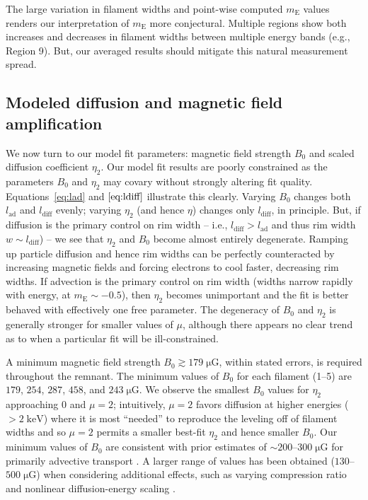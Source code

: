 \documentclass[iop, apj, numberedappendix]{emulateapj}
\newcommand*{\mt}{\mathrm}
\newcommand*{\unit}[1]{\;\mt{#1}}  %
\newcommand*{\abt}{\mathord{\sim}} %
\newcommand*{\mE}{m_\mt{E}}
\newcommand*{\muG}{\unit{\mu G}}
\begin{document}
The large variation in filament widths and point-wise computed $\mE$ values
renders our interpretation of $\mE$ more conjectural.  Multiple regions show both
increases and decreases in filament widths between multiple energy bands (e.g.,
Region 9).  But, our averaged results should mitigate this natural measurement
spread.

\subsection{Modeled diffusion and magnetic field amplification}

We now turn to our model fit parameters: magnetic field strength $B_0$ and
scaled diffusion coefficient $\eta_2$.  Our model fit results are poorly
constrained as the parameters $B_0$ and $\eta_2$ may covary without strongly
altering fit quality.  Equations~\eqref{eq:lad} and $\eqref{eq:ldiff}$
illustrate this clearly.  Varying $B_0$ changes both $l_{\mt{ad}}$ and
$l_{\mt{diff}}$ evenly; varying $\eta_2$ (and hence $\eta$) changes only
$l_{\mt{diff}}$, in principle.  But, if diffusion is the primary control on rim
width -- i.e., $l_{\mt{diff}} > l_{\mt{ad}}$ and thus rim width $w \sim
l_{\mt{diff}}$) -- we see that $\eta_2$ and $B_0$ become almost entirely
degenerate.  Ramping up particle diffusion and hence rim widths can be
perfectly counteracted by increasing magnetic fields and forcing electrons to
cool faster, decreasing rim widths.  If advection is the primary control on rim
width (widths narrow rapidly with energy, at $\mE \sim -0.5$), then $\eta_2$
becomes unimportant and the fit is better behaved with effectively one free
parameter.  The degeneracy of $B_0$ and $\eta_2$ is generally stronger for
smaller values of $\mu$, although there appears no clear trend as to when a
particular fit will be ill-constrained.

A minimum magnetic field strength $B_0 \gtrsim 179 \muG$, within stated
errors, is required throughout the remnant.  The minimum values of $B_0$ for
each filament (1--5) are $179$, $254$, $287$, $458$, and $243 \muG$.
We observe the smallest $B_0$ values for $\eta_2$ approaching $0$ and $\mu =
2$; intuitively, $\mu = 2$ favors diffusion at higher energies ($>2\unit{keV}$)
where it is most ``needed'' to reproduce the leveling off of filament widths
and so $\mu = 2$ permits a smaller best-fit $\eta_2$ and hence smaller $B_0$.
Our minimum values of $B_0$ are consistent with prior estimates of
$\abt 200$--$300 \muG$ for primarily advective transport
\citep{volk2005, parizot2006, morlino2012} .  A larger range of values has been
obtained ($130$--$500 \muG$) when considering additional effects, such as
varying compression ratio and nonlinear diffusion-energy scaling
\citep{parizot2006, cassam-chenai2007}.
\end{document}
